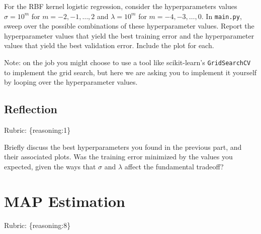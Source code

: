 \documentclass{article}
\def\rubric#1{\gre{Rubric: \{#1\}}}{}
\def\blu#1{{\color{blu}#1}}
\def\gre#1{{\color{gre}#1}}
\begin{document}
For the RBF kernel logistic regression, consider the hyperparameters values $\sigma=10^m$ for $m=-2,-1,\ldots,2$ and $\lambda=10^m$ for $m=-4,-3,\ldots,0$. \blu{In \texttt{main.py}, sweep over the possible combinations of these hyperparameter values. Report the hyperparameter values that yield the best training error and the hyperparameter values that yield the best validation error. Include the plot for each.}

Note: on the job you might choose to use a tool like scikit-learn's \texttt{GridSearchCV} to implement the grid search, but here we are asking you to implement it yourself by looping over the hyperparameter values.

\subsection{Reflection}
\rubric{reasoning:1}

Briefly discuss the best hyperparameters you found in the previous part, and their associated plots. Was the training error minimized by the values you expected, given the ways that $\sigma$ and $\lambda$ affect the fundamental tradeoff?


\section{MAP Estimation}
\rubric{reasoning:8}
\end{document}
